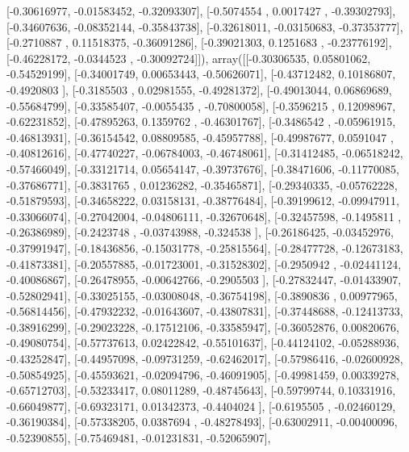 \documentclass{article}
\begin{document}
       [-0.30616977, -0.01583452, -0.32093307],
       [-0.5074554 ,  0.0017427 , -0.39302793],
       [-0.34607636, -0.08352144, -0.35843738],
       [-0.32618011, -0.03150683, -0.37353777],
       [-0.2710887 ,  0.11518375, -0.36091286],
       [-0.39021303,  0.1251683 , -0.23776192],
       [-0.46228172, -0.0344523 , -0.30092724]]), array([[-0.30306535,  0.05801062, -0.54529199],
       [-0.34001749,  0.00653443, -0.50626071],
       [-0.43712482,  0.10186807, -0.4920803 ],
       [-0.3185503 ,  0.02981555, -0.49281372],
       [-0.49013044,  0.06869689, -0.55684799],
       [-0.33585407, -0.0055435 , -0.70800058],
       [-0.3596215 ,  0.12098967, -0.62231852],
       [-0.47895263,  0.1359762 , -0.46301767],
       [-0.3486542 , -0.05961915, -0.46813931],
       [-0.36154542,  0.08809585, -0.45957788],
       [-0.49987677,  0.0591047 , -0.40812616],
       [-0.47740227, -0.06784003, -0.46748061],
       [-0.31412485, -0.06518242, -0.57466049],
       [-0.33121714,  0.05654147, -0.39737676],
       [-0.38471606, -0.11770085, -0.37686771],
       [-0.3831765 ,  0.01236282, -0.35465871],
       [-0.29340335, -0.05762228, -0.51879593],
       [-0.34658222,  0.03158131, -0.38776484],
       [-0.39199612, -0.09947911, -0.33066074],
       [-0.27042004, -0.04806111, -0.32670648],
       [-0.32457598, -0.1495811 , -0.26386989],
       [-0.2423748 , -0.03743988, -0.324538  ],
       [-0.26186425, -0.03452976, -0.37991947],
       [-0.18436856, -0.15031778, -0.25815564],
       [-0.28477728, -0.12673183, -0.41873381],
       [-0.20557885, -0.01723001, -0.31528302],
       [-0.2950942 , -0.02441124, -0.40086867],
       [-0.26478955, -0.00642766, -0.2905503 ],
       [-0.27832447, -0.01433907, -0.52802941],
       [-0.33025155, -0.03008048, -0.36754198],
       [-0.3890836 ,  0.00977965, -0.56814456],
       [-0.47932232, -0.01643607, -0.43807831],
       [-0.37448688, -0.12413733, -0.38916299],
       [-0.29023228, -0.17512106, -0.33585947],
       [-0.36052876,  0.00820676, -0.49080754],
       [-0.57737613,  0.02422842, -0.55101637],
       [-0.44124102, -0.05288936, -0.43252847],
       [-0.44957098, -0.09731259, -0.62462017],
       [-0.57986416, -0.02600928, -0.50854925],
       [-0.45593621, -0.02094796, -0.46091905],
       [-0.49981459,  0.00339278, -0.65712703],
       [-0.53233417,  0.08011289, -0.48745643],
       [-0.59799744,  0.10331916, -0.66049877],
       [-0.69323171,  0.01342373, -0.4404024 ],
       [-0.6195505 , -0.02460129, -0.36190384],
       [-0.57338205,  0.0387694 , -0.48278493],
       [-0.63002911, -0.00400096, -0.52390855],
       [-0.75469481, -0.01231831, -0.52065907],
\end{document}
